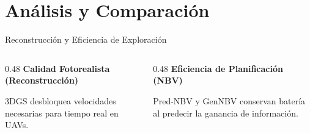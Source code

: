 \documentclass[aspectratio=169]{beamer}
\begin{document}
	\section{Análisis y Comparación}
	
	\begin{frame}{Reconstrucción y Eficiencia de Exploración}
		\begin{columns}
			\begin{column}{0.48\textwidth}
				\textbf{Calidad Fotorealista (Reconstrucción)}
				\begin{table}[htbp]
				\end{table}
				\scriptsize 3DGS desbloquea velocidades necesarias para tiempo real en UAVs.
			\end{column}
			
			\begin{column}{0.48\textwidth}
				\textbf{Eficiencia de Planificación (NBV)}
				\begin{table}[htbp]
				\end{table}
				\scriptsize Pred-NBV y GenNBV conservan batería al predecir la ganancia de información.
			\end{column}
		\end{columns}
	\end{frame}
	
\end{document}
